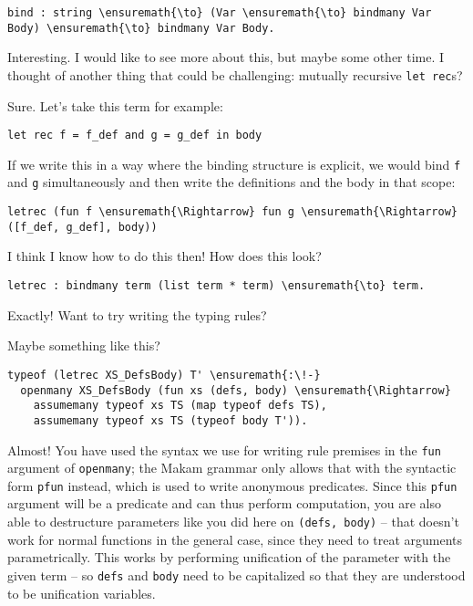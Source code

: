\begin{verbatim}
bind : string \ensuremath{\to} (Var \ensuremath{\to} bindmany Var Body) \ensuremath{\to} bindmany Var Body.
\end{verbatim}

\heroSTUDENT{} Interesting. I would like to see more about this, but maybe
some other time. I thought of another thing that could be challenging:
mutually recursive \texttt{let\ rec}s?

\heroADVISOR{} Sure. Let's take this term for example:

\begin{verbatim}
let rec f = f_def and g = g_def in body
\end{verbatim}

If we write this in a way where the binding structure is explicit, we
would bind \texttt{f} and \texttt{g} simultaneously and then write the
definitions and the body in that scope:

\begin{verbatim}
letrec (fun f \ensuremath{\Rightarrow} fun g \ensuremath{\Rightarrow} ([f_def, g_def], body))
\end{verbatim}

\heroSTUDENT{} I think I know how to do this then! How does this look?

\begin{verbatim}
letrec : bindmany term (list term * term) \ensuremath{\to} term.
\end{verbatim}

\heroADVISOR{} Exactly! Want to try writing the typing rules?

\heroSTUDENT{} Maybe something like this?

\begin{verbatim}
typeof (letrec XS_DefsBody) T' \ensuremath{:\!-}
  openmany XS_DefsBody (fun xs (defs, body) \ensuremath{\Rightarrow}
    assumemany typeof xs TS (map typeof defs TS),
    assumemany typeof xs TS (typeof body T')).
\end{verbatim}

\heroADVISOR{} Almost! You have used the syntax we use for writing rule
premises in the \texttt{fun} argument of \texttt{openmany}; the Makam
grammar only allows that with the syntactic form \texttt{pfun} instead,
which is used to write anonymous predicates. Since this \texttt{pfun}
argument will be a predicate and can thus perform computation, you are
also able to destructure parameters like you did here on
\texttt{(defs,\ body)} -- that doesn't work for normal functions in the
general case, since they need to treat arguments parametrically. This
works by performing unification of the parameter with the given term --
so \texttt{defs} and \texttt{body} need to be capitalized so that they
are understood to be unification variables.

